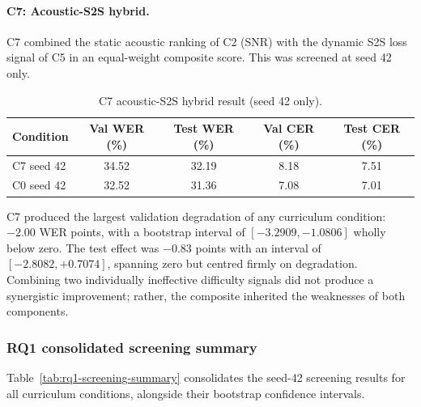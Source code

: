 \paragraph{C7: Acoustic-S2S hybrid.}

C7 combined the static acoustic ranking of C2 (SNR) with the dynamic S2S
loss signal of C5 in an equal-weight composite score. This was screened at
seed 42 only.

\begin{table}[H]
\centering
\caption{C7 acoustic-S2S hybrid result (seed 42 only).}
\label{tab:c7-hybrid}
\begin{tabular}{lcccc}
\hline
\textbf{Condition} & \textbf{Val WER (\%)} & \textbf{Test WER (\%)} & \textbf{Val CER (\%)} & \textbf{Test CER (\%)} \\
\hline
C7 seed 42       & 34.52 & 32.19 & 8.18 & 7.51 \\
C0 seed 42       & 32.52 & 31.36 & 7.08 & 7.01 \\
\hline
\end{tabular}
\end{table}

C7 produced the largest validation degradation of any curriculum condition:
$-2.00$ WER points, with a bootstrap interval of $[-3.2909, -1.0806]$ wholly
below zero. The test effect was $-0.83$ points with an interval of
$[-2.8082, +0.7074]$, spanning zero but centred firmly on degradation.
Combining two individually ineffective difficulty signals did not produce a
synergistic improvement; rather, the composite inherited the weaknesses of both
components.


\subsubsection{RQ1 consolidated screening summary}

Table~\ref{tab:rq1-screening-summary} consolidates the seed-42 screening
results for all curriculum conditions, alongside their bootstrap confidence
intervals.

